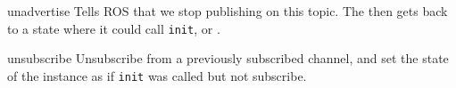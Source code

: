 \begin{urbiscriptapi}
\item[unadvertise]%
  Tells ROS that we stop publishing on this topic. The \UObject then gets back
  to a state where it could call \lstinline{init},  or
  .


\item[unsubscribe]%
  Unsubscribe from a previously subscribed channel, and set the state of the
  instance as if \lstinline{init} was called but not subscribe.
\end{urbiscriptapi}

